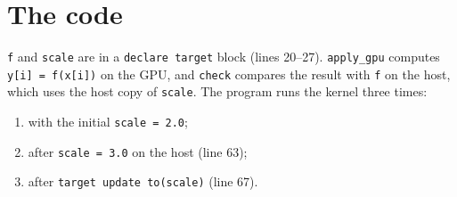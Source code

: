 \documentclass[11pt,a4paper]{article}
\let\origtexttt\texttt
\renewcommand{\texttt}[1]{\textcolor{black!60}{\origtexttt{#1}}}
\begin{document}
\section{The code}
\texttt{f} and \texttt{scale} are in a \texttt{declare target} block (lines 20--27).
\texttt{apply\_gpu} computes \texttt{y[i] = f(x[i])} on the GPU, and \texttt{check} compares the
result with \texttt{f} on the host, which uses the host copy of \texttt{scale}. The program runs
the kernel three times:
\begin{enumerate}
  \item with the initial \texttt{scale = 2.0};
  \item after \texttt{scale = 3.0} on the host (line 63);
  \item after \texttt{target update to(scale)} (line 67).
\end{enumerate}
\end{document}
